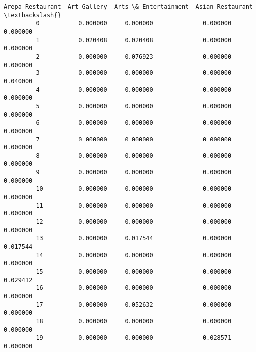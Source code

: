 \documentclass[11pt]{article}
\begin{document}
\begin{Verbatim}[commandchars=\\\{\}]
             Arepa Restaurant  Art Gallery  Arts \& Entertainment  Asian Restaurant  \textbackslash{}
         0           0.000000     0.000000              0.000000          0.000000   
         1           0.020408     0.020408              0.000000          0.000000   
         2           0.000000     0.076923              0.000000          0.000000   
         3           0.000000     0.000000              0.000000          0.040000   
         4           0.000000     0.000000              0.000000          0.000000   
         5           0.000000     0.000000              0.000000          0.000000   
         6           0.000000     0.000000              0.000000          0.000000   
         7           0.000000     0.000000              0.000000          0.000000   
         8           0.000000     0.000000              0.000000          0.000000   
         9           0.000000     0.000000              0.000000          0.000000   
         10          0.000000     0.000000              0.000000          0.000000   
         11          0.000000     0.000000              0.000000          0.000000   
         12          0.000000     0.000000              0.000000          0.000000   
         13          0.000000     0.017544              0.000000          0.017544   
         14          0.000000     0.000000              0.000000          0.000000   
         15          0.000000     0.000000              0.000000          0.029412   
         16          0.000000     0.000000              0.000000          0.000000   
         17          0.000000     0.052632              0.000000          0.000000   
         18          0.000000     0.000000              0.000000          0.000000   
         19          0.000000     0.000000              0.028571          0.000000   
         

\end{Verbatim}
\end{document}
